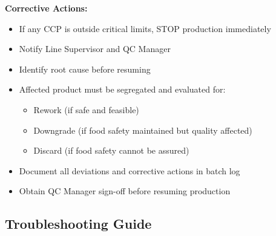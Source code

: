 {\vspace{1em}
\noindent\textbf{Corrective Actions:}
\begin{itemize}
\item If any CCP is outside critical limits, STOP production immediately
\item Notify Line Supervisor and QC Manager
\item Identify root cause before resuming
\item Affected product must be segregated and evaluated for:
  \begin{itemize}
  \item Rework (if safe and feasible)
  \item Downgrade (if food safety maintained but quality affected)
  \item Discard (if food safety cannot be assured)
  \end{itemize}
\item Document all deviations and corrective actions in batch log
\item Obtain QC Manager sign-off before resuming production
\end{itemize}


\subsection*{Troubleshooting Guide}

}
